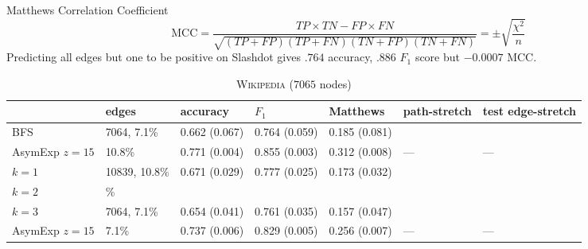 \documentclass[a4paper,final,notitlepage,11pt,svgnames]{scrartcl}
\begin{document}


Matthews Correlation Coefficient \[
	\text{MCC} = \frac{ TP \times TN - FP \times FN } {\sqrt{ (TP + FP) ( TP + FN ) (
			TN + FP ) ( TN + FN ) } } = \pm \sqrt{\frac{\chi^2}{n}}
\]
Predicting all edges but one to be positive on Slashdot gives $.764$ accuracy,
$.886$ $F_1$ score but $-0.0007$ MCC.

\begin{table}[htpb]
	\centering
	\caption{\textsc{Wikipedia} ($7065$ nodes) \label{tab:wiki}}
	\begin{tabular}{lllllll}
		\toprule
		         & edges         & accuracy      & $F_1$         & Matthews      & path-stretch & test edge-stretch \\
		\midrule
		BFS      & 7064, 7.1\%   & 0.662 (0.067) & 0.764 (0.059) & 0.185 (0.081) &              & \\
		AsymExp $z=15$ & 10.8\%  & 0.771 (0.004) & 0.855 (0.003) & 0.312 (0.008) & ---          & --- \\
		$k=1$    & 10839, 10.8\% & 0.671 (0.029) & 0.777 (0.025) & 0.173 (0.032) &              & \\
		$k=2$    & \%            &               &               &               &              & \\
		$k=3$    & 7064, 7.1\%   & 0.654 (0.041) & 0.761 (0.035) & 0.157 (0.047) &              & \\
		AsymExp $z=15$ & 7.1\%   & 0.737 (0.006) & 0.829 (0.005) & 0.256 (0.007) & ---          & --- \\
		\bottomrule
	\end{tabular}
\end{table}
\end{document}

